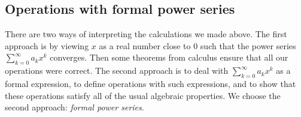 \subsection{Operations with formal power series}
\label{sec:OperFPS}
There are two ways of interpreting the calculations we made above.
The first approach is by viewing $x$ as a real number close to $0$ such that the power series $\sum_{k=0}^\infty a_k x^k$ converges.
Then some theorems from calculus ensure that all our operations were correct.
The second approach is to deal with $\sum_{k=0}^\infty a_k x^k$ as a formal expression,
to define operations with such expressions, and to show that these operations satisfy all of the usual algebraic properties.
We choose the second approach: \emph{formal power series}.
